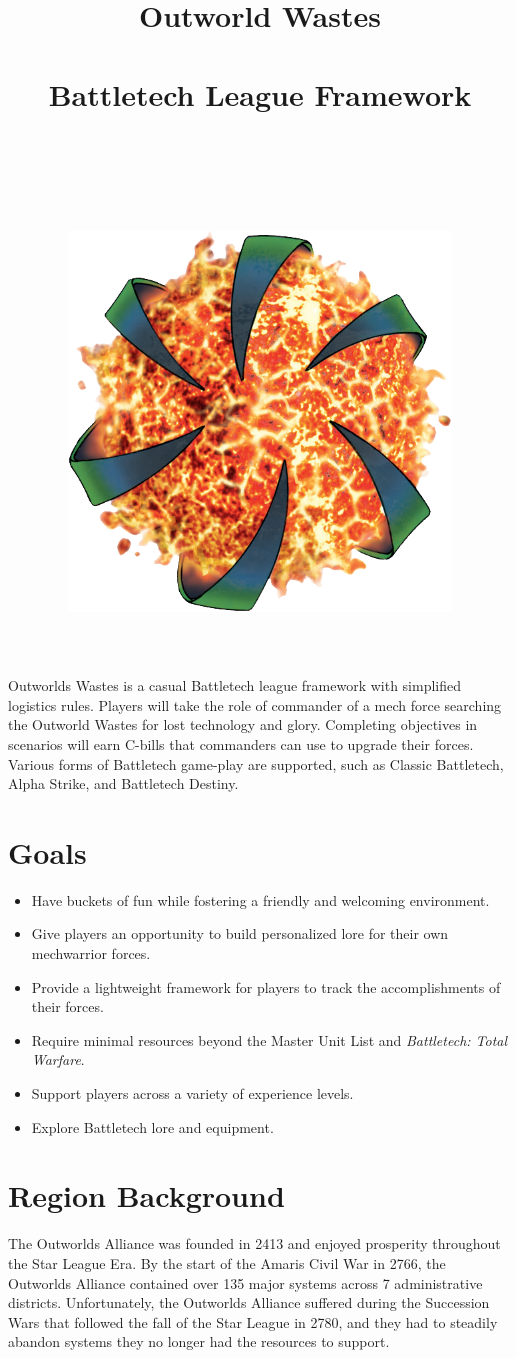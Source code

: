 \documentclass[UTF8]{article}
\title{
  Outworld Wastes\\
  ~\\
  \large Battletech League Framework \\
  ~\\
  ~\\
  ~\\
  \includegraphics[width=4in]{../img/Outworlds_Alliance.png}
}
\author{}
\date{}
\begin{document}
\maketitle

\newpage

Outworlds Wastes is a casual Battletech league framework with simplified logistics rules.
Players will take the role of commander of a mech force searching the Outworld Wastes for lost technology and glory.
Completing objectives in scenarios will earn C-bills that commanders can use to upgrade their forces.
Various forms of Battletech game-play are supported, such as Classic Battletech, Alpha Strike, and Battletech Destiny.\\

\section*{Goals}

\begin{itemize}

\item Have buckets of fun while fostering a friendly and welcoming environment.

\item Give players an opportunity to build personalized lore for their own mechwarrior forces.

\item Provide a lightweight framework for players to track the accomplishments of their forces.

\item Require minimal resources beyond the Master Unit List and \emph{Battletech: Total Warfare}.

\item Support players across a variety of experience levels.

\item Explore Battletech lore and equipment.

\end{itemize}

\newpage

\section{Region Background}

The Outworlds Alliance was founded in 2413 and enjoyed prosperity throughout the Star League Era.
By the start of the Amaris Civil War in 2766, the Outworlds Alliance contained over 135 major systems across 7 administrative districts.
Unfortunately, the Outworlds Alliance suffered during the Succession Wars that followed the fall of the Star League in 2780, and they had to steadily abandon systems they no longer had the resources to support.\\
\end{document}

